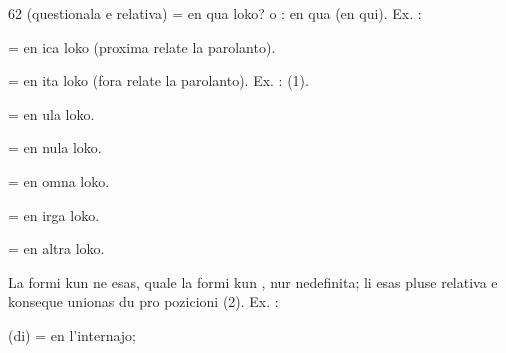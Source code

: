 \begin{VUpage}[66]{62}
\VUblancAlinea
{} (questionala e relativa) = en qua loko? o : en qua\nl
(en qui). Ex. : 

 = en ica loko (proxima relate la parolanto).

 = en ita loko (fora relate la parolanto). Ex. : \nl
{} (1).

 = en ula loko.

 = en nula loko.

 = en omna loko.

 = en irga loko.

 = en altra loko.

La formi kun  ne esas, quale la formi kun , nur\nl
nedefinita; li esas pluse relativa e konseque unionas du pro\cc
pozicioni (2). Ex. : \nl
{}

 (di) = en l'internajo;
\end{VUpage}


